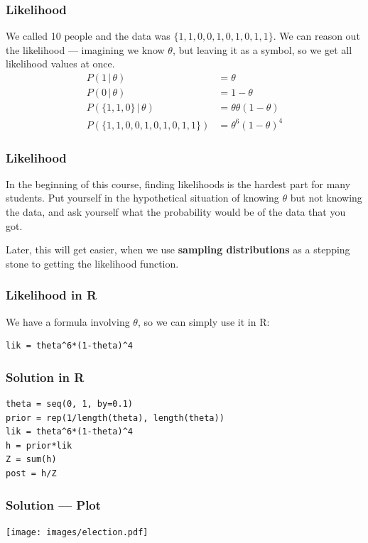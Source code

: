 \documentclass{beamer}
\newcommand{\given}{\,|\,}
\begin{document}
\begin{frame}
\frametitle{Likelihood}
We called 10 people and the data was
$\{1, 1, 0, 0, 1, 0, 1, 0, 1, 1\}$. We can reason out the likelihood
--- imagining we know $\theta$, but leaving it as a symbol, so we get
all likelihood values at once.\pause
\begin{align}
P(1 \given \theta) &= \theta \\
P(0 \given \theta) &= 1-\theta \\
P(\{1, 1, 0\} \given \theta) &= \theta\theta(1-\theta) \\
P(\{1, 1, 0, 0, 1, 0, 1, 0, 1, 1\}) &= \theta^6(1-\theta)^4
\end{align}



\end{frame}

\begin{frame}
\frametitle{Likelihood}
In the beginning of this course, finding likelihoods is the hardest
part for many students. Put yourself in the hypothetical situation
of knowing $\theta$ but not knowing the data, and ask yourself
what the probability would be of the data that you got.\\[1em]\pause

Later, this will get easier, when we use
{\bf sampling distributions}
as a stepping stone to getting the likelihood function.

\end{frame}

\begin{frame}[fragile]
\frametitle{Likelihood in R}
We have a formula involving $\theta$, so we can simply use it
in R:

\begin{verbatim}
lik = theta^6*(1-theta)^4
\end{verbatim}

\end{frame}

\begin{frame}[fragile]
\frametitle{Solution in R}

\begin{verbatim}
theta = seq(0, 1, by=0.1)
prior = rep(1/length(theta), length(theta))
lik = theta^6*(1-theta)^4
h = prior*lik
Z = sum(h)
post = h/Z
\end{verbatim}
\end{frame}


\begin{frame}
\frametitle{Solution --- Plot}

\centering
\texttt{[image: images/election.pdf]}

\end{frame}
\end{document}
